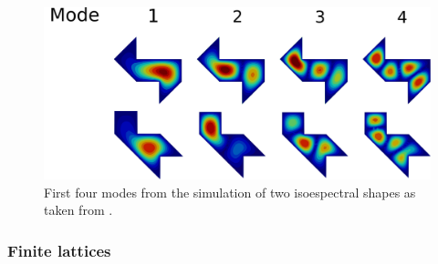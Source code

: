 \begin{figure}
\centering
\includegraphics[scale=0.15]{./img/isoespectral.pdf}
\caption{First four modes from the simulation of two isoespectral shapes as taken from \cite{Chapman1995}.}
\label{fig:isoespectral_waveguide}
\end{figure}

\subsubsection{Finite lattices}

